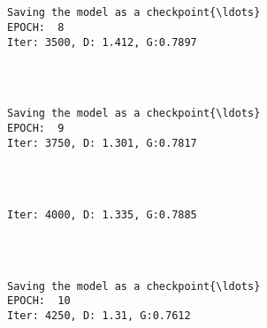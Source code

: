 \documentclass[11pt]{article}
\begin{document}
    \begin{center}
    \end{center}
    { \hspace*{\fill} \\}
    
    \begin{Verbatim}[commandchars=\\\{\}]

Saving the model as a checkpoint{\ldots}
EPOCH:  8
Iter: 3500, D: 1.412, G:0.7897
    \end{Verbatim}

    \begin{center}
    \end{center}
    { \hspace*{\fill} \\}
    
    \begin{Verbatim}[commandchars=\\\{\}]

Saving the model as a checkpoint{\ldots}
EPOCH:  9
Iter: 3750, D: 1.301, G:0.7817
    \end{Verbatim}

    \begin{center}
    \end{center}
    { \hspace*{\fill} \\}
    
    \begin{Verbatim}[commandchars=\\\{\}]

Iter: 4000, D: 1.335, G:0.7885
    \end{Verbatim}

    \begin{center}
    \end{center}
    { \hspace*{\fill} \\}
    
    \begin{Verbatim}[commandchars=\\\{\}]

Saving the model as a checkpoint{\ldots}
EPOCH:  10
Iter: 4250, D: 1.31, G:0.7612
    \end{Verbatim}
\end{document}
